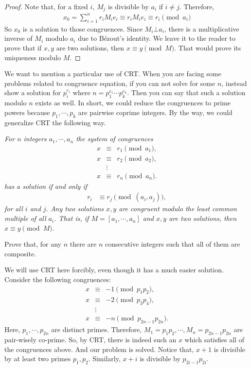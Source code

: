 \documentclass{subfile}
\begin{document}
		\begin{proof}
			Note that, for a fixed $i$, $M_j$ is divisible by $a_i$ if $i\neq j$. Therefore,
			\begin{align*}
			x_0 = \sum_{i=1}^{n} r_i M_ie_i \equiv r_iM_ie_i\equiv r_i\pmod{a_i}
			\end{align*}
			So $x_0$ is a solution to those congruences. Since $M_i\bot a_i$, there is a multiplicative inverse of $M_i$ modulo $a_i$ due to B\'{e}zout's identity. We leave it to the reader to prove that if $x,y$ are two solutions, then $x\equiv y\pmod M$. That would prove its uniqueness modulo $M$.
		\end{proof}
	We want to mention a particular use of CRT. When you are facing some problems related to congruence equation, if you can not solve for some $n$, instead show a solution for $p_i^{e_i}$ where $n=p_1^{e_1}\cdots p_k^{e_k}$. Then you can say that such a solution modulo $n$ exists as well. In short, we could reduce the congruences to prime powers because $p_1,\cdots,p_k$ are pairwise coprime integers. By the way, we could generalize CRT the following way.
		\begin{theorem}\slshape
			For $n$ integers $a_1,\cdots,a_n$ the system of congruences
			\begin{eqnarray*}
				x & \equiv& r_1\pmod{a_1},\\
				x & \equiv& r_2\pmod{a_2},\\
				&\vdots&\\
				x & \equiv& r_n\pmod{a_n}.
			\end{eqnarray*}
			has a solution if and only if
			\begin{align*}
			r_i & \equiv r_j\pmod{(a_i,a_j)},
			\end{align*}
			for all $i$ and $j$. Any two solutions $x,y$ are congruent modulo the least common multiple of all $a_i$. That is, if $M=[a_1,\cdots,a_n]$ and $x,y$ are two solutions, then $x\equiv y\pmod M$.
		\end{theorem}
	
		\begin{problem}
			Prove that, for any $n$ there are $n$ consecutive integers such that all of them are composite.
		\end{problem}
		
		\begin{solution}
			We will use CRT here forcibly, even though it has a much easier solution. Consider the following congruences:
				\begin{eqnarray*}
					x & \equiv& -1\pmod{p_1p_2},\\
					x & \equiv& -2\pmod{p_3p_4},\\
					  & \vdots& \\
					x & \equiv& -n\pmod{p_{2n-1}p_{2n}}.
				\end{eqnarray*}
			Here, $p_1,\cdots,p_{2n}$ are distinct primes. Therefore, $M_1=p_1p_2,\cdots,M_n=p_{2n-1}p_{2n}$ are pair-wisely co-prime. So, by CRT, there is indeed such an $x$ which satisfies all of the congruences above. And our problem is solved. Notice that, $x+1$ is divisible by at least two primes $p_1,p_2$. Similarly, $x+i$ is divisible by $p_{2i-1}p_{2i}$.
		\end{solution}
	
\end{document}

